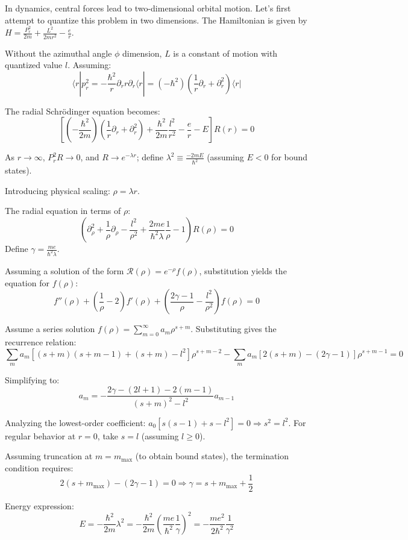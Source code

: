 \documentclass[12pt]{article}
\begin{document}
In dynamics, central forces lead to two-dimensional orbital motion. Let's first attempt to quantize this problem in two dimensions. The Hamiltonian is given by $H=\frac{P_r^2}{2m}+\frac{L^2}{2mr^2}-\frac{e}{r}$. 

Without the azimuthal angle $\phi$ dimension, $L$ is a constant of motion with quantized value $l$. Assuming:
$$\langle r|p_r^2 = -\frac{\hbar^2}{r}\partial_r r\partial_r \langle r| = (-\hbar^2)\left(\frac{1}{r}\partial_r + \partial_r^2\right)\langle r|$$

The radial Schrödinger equation becomes:
$$\left[\left(-\frac{\hbar^2}{2m}\right)\left(\frac{1}{r}\partial_r + \partial_r^2\right) + \frac{\hbar^2}{2m}\frac{l^2}{r^2} - \frac{e}{r} - E\right]R(r) = 0$$

As $r \rightarrow \infty$, $P_r^2 R \rightarrow 0$, and $R \rightarrow e^{-\lambda r}$; define $\lambda^2 \equiv \frac{-2mE}{\hbar^2}$ (assuming $E<0$ for bound states).

Introducing physical scaling: $\rho = \lambda r$.

The radial equation in terms of $\rho$:
$$\left(\partial_\rho^2 + \frac{1}{\rho}\partial_\rho - \frac{l^2}{\rho^2} + \frac{2me}{\hbar^2\lambda}\frac{1}{\rho} - 1\right)R(\rho) = 0$$
Define $\gamma = \frac{me}{\hbar^2\lambda}$.

Assuming a solution of the form $\mathcal{R}(\rho) = e^{-\rho}f(\rho)$, substitution yields the equation for $f(\rho)$:
$$f''(\rho) + \left(\frac{1}{\rho} - 2\right)f'(\rho) + \left(\frac{2\gamma-1}{\rho} - \frac{l^2}{\rho^2}\right)f(\rho) = 0$$

Assume a series solution $f(\rho) = \sum_{m=0}^\infty a_m \rho^{s+m}$. Substituting gives the recurrence relation:
$$\sum_{m} a_m \left[(s+m)(s+m-1) + (s+m) - l^2\right]\rho^{s+m-2} - \sum_{m} a_m \left[2(s+m) - (2\gamma-1)\right]\rho^{s+m-1} = 0$$

Simplifying to:
$$a_m = -\frac{2\gamma - (2l+1) - 2(m-1)}{(s+m)^2 - l^2}a_{m-1}$$

Analyzing the lowest-order coefficient: $a_0[s(s-1) + s - l^2] = 0 \Rightarrow s^2 = l^2$. For regular behavior at $r=0$, take $s=l$ (assuming $l \geq 0$).

Assuming truncation at $m = m_{\text{max}}$ (to obtain bound states), the termination condition requires:
$$2(s + m_{\text{max}}) - (2\gamma - 1) = 0 \Rightarrow \gamma = s + m_{\text{max}} + \frac{1}{2}$$

Energy expression:
$$E = -\frac{\hbar^2}{2m}\lambda^2 = -\frac{\hbar^2}{2m}\left(\frac{me}{\hbar^2}\frac{1}{\gamma}\right)^2 = -\frac{me^2}{2\hbar^2}\frac{1}{\gamma^2}$$
\end{document}
